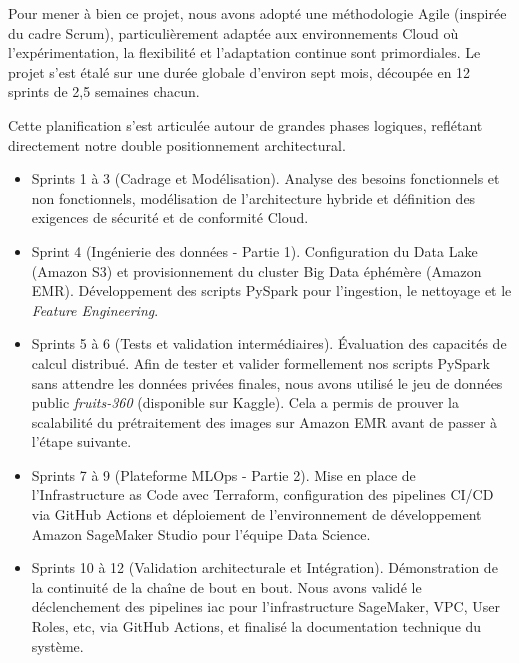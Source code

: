Pour mener à bien ce projet, nous avons adopté une méthodologie Agile (inspirée du cadre Scrum), particulièrement adaptée aux environnements Cloud où l'expérimentation, la flexibilité et l'adaptation continue sont primordiales. Le projet s'est étalé sur une durée globale d'environ sept mois, découpée en 12 sprints de 2,5 semaines chacun.

Cette planification s'est articulée autour de grandes phases logiques, reflétant directement notre double positionnement architectural.

\begin{itemize}
    \item[$\bullet$] Sprints 1 à 3 (Cadrage et Modélisation). Analyse des besoins fonctionnels et non fonctionnels, modélisation de l'architecture hybride et définition des exigences de sécurité et de conformité Cloud.
    
    \item[$\bullet$] Sprint 4 (Ingénierie des données - Partie 1). Configuration du Data Lake (Amazon S3) et provisionnement du cluster Big Data éphémère (Amazon EMR). Développement des scripts PySpark pour l'ingestion, le nettoyage et le \textit{Feature Engineering}.
    
    \item[$\bullet$] Sprints 5 à 6 (Tests et validation intermédiaires). Évaluation des capacités de calcul distribué. Afin de tester et valider formellement nos scripts PySpark sans attendre les données privées finales, nous avons utilisé le jeu de données public \textit{fruits-360} (disponible sur Kaggle). Cela a permis de prouver la scalabilité du prétraitement des images sur Amazon EMR avant de passer à l'étape suivante.
    
    \item[$\bullet$] Sprints 7 à 9 (Plateforme MLOps - Partie 2). Mise en place de l'Infrastructure as Code avec Terraform, configuration des pipelines CI/CD via GitHub Actions et déploiement de l'environnement de développement Amazon SageMaker Studio pour l'équipe Data Science.
    
    \item[$\bullet$] Sprints 10 à 12 (Validation architecturale et Intégration). Démonstration de la continuité de la chaîne de bout en bout. Nous avons validé le déclenchement des pipelines iac pour l'infrastructure SageMaker, VPC, User Roles, etc, via GitHub Actions, et finalisé la documentation technique du système.
\end{itemize}

